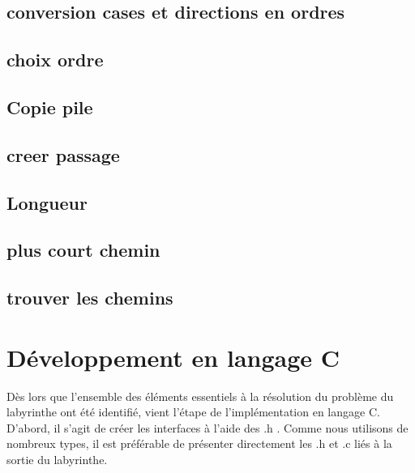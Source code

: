         \subsection{conversion cases et directions en ordres}
             
        \subsection{choix ordre}
             
        \subsection{Copie pile}
             
        \subsection{creer passage}
             
        \subsection{Longueur}
             
        \subsection{plus court chemin}
             
        \subsection{trouver les chemins}
            
        \vspace{2mm}

    \section{Développement en langage C}

        \vspace{2mm}
        Dès lors que l'ensemble des éléments essentiels à la résolution du problème du labyrinthe ont été identifié, vient l'étape de l'implémentation en langage C. D'abord, il s'agit de créer les interfaces à l'aide des .h . Comme nous utilisons de nombreux types, il est préférable de présenter directement les .h et .c liés à la sortie du labyrinthe.
